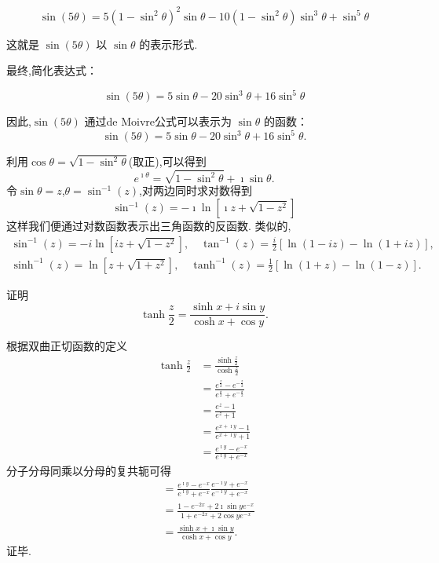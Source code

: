 \begin{solution}
    \[
    \sin(5\theta) = 5(1 - \sin^2\theta)^2\sin\theta - 10(1 - \sin^2\theta)\sin^3\theta + \sin^5\theta
    \]
    
    这就是 $\sin(5\theta)$ 以 $\sin\theta$ 的表示形式.
    
    最终,简化表达式：
    
    \[
    \sin(5\theta) = 5\sin\theta - 20\sin^3\theta + 16\sin^5\theta
    \]
    
    因此,$\sin(5\theta)$ 通过de Moivre公式可以表示为 $\sin\theta$ 的函数：
    \[
    \sin(5\theta) = 5\sin\theta - 20\sin^3\theta + 16\sin^5\theta.
    \]
    
\end{solution}



利用$\cos \theta = \sqrt{1 - \sin ^2 \theta }$(取正),可以得到
\begin{equation}
  e^{\imath \theta} = \sqrt{ 1 - \sin ^2 \theta } + \imath \sin \theta .  
\end{equation} 
令$\sin \theta = z$,$\theta = \sin^{-1} (z)$,对两边同时求对数得到
\begin{equation}
    \sin^{-1} (z) = -\imath \ln \left[ \imath z + \sqrt{1-z^2} \right]
\end{equation}
这样我们便通过对数函数表示出三角函数的反函数.
类似的,
\begin{equation}
    \begin{array}{cc}
    \sin ^{-1}(z)=-i \ln \left[i z+\sqrt{1-z^2}\right], \quad \tan ^{-1}(z)=\frac{i}{2}[\ln (1-i z)-\ln (1+i z)], \\
    \sinh ^{-1}(z)=\ln \left[z+\sqrt{1+z^2}\right], \quad \tanh ^{-1}(z)=\frac{1}{2}[\ln (1+z)-\ln (1-z)] .
    \end{array}
\end{equation}

\begin{example}
    证明
    \[
        \tanh \frac{z}{2}=\frac{\sinh x+i \sin y}{\cosh x+\cos y} .  
    \]
\end{example}
\begin{solution}
根据双曲正切函数的定义
\begin{align*}
    \tanh \frac{z}{2} &= \frac{\sinh \frac{z}{2} }{ \cosh \frac{z}{2}}
    \\
    &= \frac{e^{\frac{z}{2}} - e^{-\frac{z}{2}}}{e^{\frac{z}{2}} + e^{-\frac{z}{2}}}
    \\
    &= \frac{e^{z} - 1}{e^{z} + 1} 
    \\
    &= \frac{e^{x+\imath y } -1 } { e^{x + \imath y } + 1}
    \\
    &=\frac{e^{\imath y } -e^{-x} } { e^{\imath y } + e^{-x}}
\end{align*}   
分子分母同乘以分母的复共轭可得
\begin{align*}
    &=\frac{e^{\imath y } -e^{-x} } { e^{\imath y } + e^{-x}} \frac{e^{-\imath y } + e^{-x}} { e^{-\imath y } + e^{-x}}
    \\
    &=\frac{ 1 - e^{-2x} + 2 \imath \sin y e^{-x}}{1+ e^{-2x} + 2 \cos y e^{-x} }
    \\
    &= \frac{\sinh x + \imath \sin y} {\cosh x + \cos y} .  
\end{align*}
证毕.
\end{solution}

